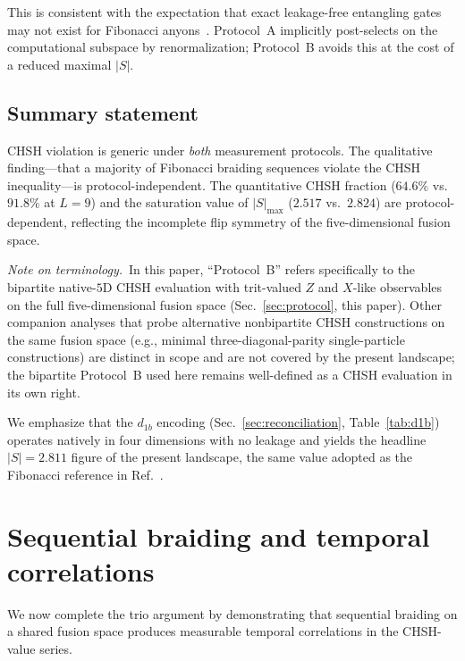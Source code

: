 \documentclass[aps,pra,twocolumn,superscriptaddress,longbibliography,floatfix,nofootinbib]{revtex4-2}
\begin{document}
This is consistent with the expectation that exact leakage-free
entangling gates may not exist for Fibonacci anyons~\cite{Cui2019}.
Protocol~A implicitly post-selects on the computational subspace by
renormalization; Protocol~B avoids this at the cost of a reduced
maximal $|S|$.

\subsection{Summary statement}

CHSH violation is generic under \emph{both} measurement protocols.
The qualitative finding---that a majority of Fibonacci braiding
sequences violate the CHSH inequality---is protocol-independent.
The quantitative CHSH fraction ($64.6\%$ vs.\ $91.8\%$ at $L=9$)
and the saturation value of $|S|_{\max}$ ($2.517$ vs.\ $2.824$)
are protocol-dependent, reflecting the incomplete flip symmetry
of the five-dimensional fusion space.

\textit{Note on terminology.}\, In this paper, ``Protocol~B'' refers
specifically to the bipartite native-$5$D CHSH evaluation with
trit-valued $Z$ and $X$-like observables on the full five-dimensional
fusion space (Sec.~\ref{sec:protocol}, this paper). Other companion
analyses that probe alternative nonbipartite CHSH constructions on
the same fusion space (e.g., minimal three-diagonal-parity
single-particle constructions) are distinct in scope and are not
covered by the present landscape; the bipartite Protocol~B used here
remains well-defined as a CHSH evaluation in its own right.

We emphasize that the $d_{1b}$ encoding
(Sec.~\ref{sec:reconciliation}, Table~\ref{tab:d1b}) operates
natively in four dimensions with no leakage and yields the
headline $|S|=2.811$ figure of the present landscape, the same
value adopted as the Fibonacci reference in
Ref.~\cite{Sayim2026topological}.

\section{Sequential braiding and temporal correlations}
\label{sec:sequential}

We now complete the trio argument by demonstrating that sequential
braiding on a shared fusion space produces measurable temporal
correlations in the CHSH-value series.
\end{document}
